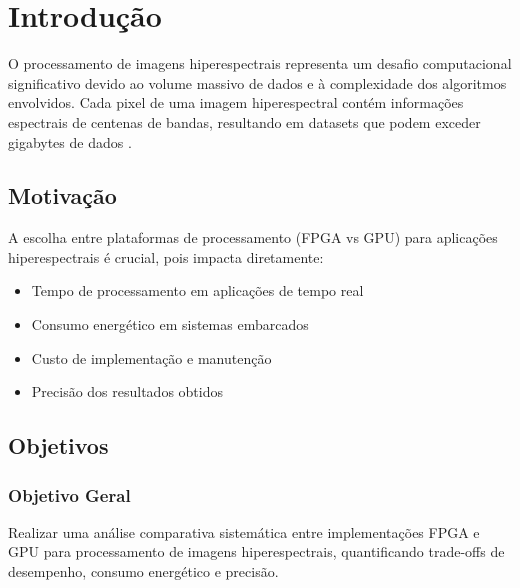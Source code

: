 \chapter{Introdução}\label{chp:Introducao}

O processamento de imagens hiperespectrais representa um desafio computacional significativo devido ao volume massivo de dados e à complexidade dos algoritmos envolvidos. Cada pixel de uma imagem hiperespectral contém informações espectrais de centenas de bandas, resultando em datasets que podem exceder gigabytes de dados \cite{referencia_contextual}.


\section{Motivação}\label{sec:motivacao}

A escolha entre plataformas de processamento (FPGA vs GPU) para aplicações hiperespectrais é crucial, pois impacta diretamente:
\begin{itemize}
    \item Tempo de processamento em aplicações de tempo real
    \item Consumo energético em sistemas embarcados
    \item Custo de implementação e manutenção
    \item Precisão dos resultados obtidos
\end{itemize}


\section{Objetivos}\label{sec:objetivos}

\subsection{Objetivo Geral}
Realizar uma análise comparativa sistemática entre implementações FPGA e GPU para processamento de imagens hiperespectrais, quantificando trade-offs de desempenho, consumo energético e precisão.

